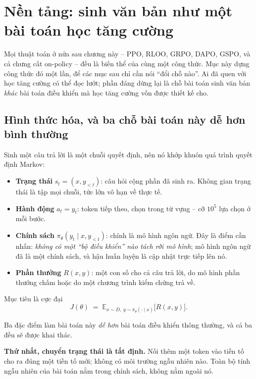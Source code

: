 
\section{Nền tảng: sinh văn bản như một bài toán học tăng cường}
\label{sec:rl_foundations}

Mọi thuật toán ở nửa sau chương này -- PPO, RLOO, GRPO, DAPO, GSPO, và cả chưng cất on-policy -- đều là biến thể của cùng một công thức. Mục này dựng công thức đó một lần, để các mục sau chỉ cần nói ``đổi chỗ nào''. Ai đã quen với học tăng cường có thể đọc lướt; phần đáng dừng lại là chỗ bài toán sinh văn bản \emph{khác} bài toán điều khiển mà học tăng cường vốn được thiết kế cho.

\subsection{Hình thức hóa, và ba chỗ bài toán này dễ hơn bình thường}
\label{ssec:rl_formalization}

Sinh một câu trả lời là một chuỗi quyết định, nên nó khớp khuôn quá trình quyết định Markov:
\begin{itemize}
	\item \textbf{Trạng thái} $s_t = (x, y_{<t})$: câu hỏi cộng phần đã sinh ra. Không gian trạng thái là tập mọi chuỗi, tức lớn vô hạn về thực tế.
	\item \textbf{Hành động} $a_t = y_t$: token tiếp theo, chọn trong từ vựng -- cỡ $10^5$ lựa chọn ở mỗi bước.
	\item \textbf{Chính sách} $\pi_\theta(y_t \mid x, y_{<t})$: chính là mô hình ngôn ngữ. Đây là điểm cần nhấn: \emph{không có một ``bộ điều khiển'' nào tách rời mô hình}; mô hình ngôn ngữ đã là một chính sách, và hậu huấn luyện là cập nhật trực tiếp lên nó.
	\item \textbf{Phần thưởng} $R(x,y)$: một con số cho cả câu trả lời, do mô hình phần thưởng chấm hoặc do một chương trình kiểm chứng trả về.
\end{itemize}
Mục tiêu là cực đại
\[
J(\theta) \;=\; \mathbb{E}_{x \sim D,\; y \sim \pi_\theta(\cdot \mid x)}\big[R(x,y)\big].
\]

Ba đặc điểm làm bài toán này \emph{dễ hơn} bài toán điều khiển thông thường, và cả ba đều sẽ được khai thác.

\textbf{Thứ nhất, chuyển trạng thái là tất định.} Nối thêm một token vào tiền tố cho ra đúng một tiền tố mới; không có môi trường ngẫu nhiên nào. Toàn bộ tính ngẫu nhiên của bài toán nằm trong chính sách, không nằm ngoài nó.

